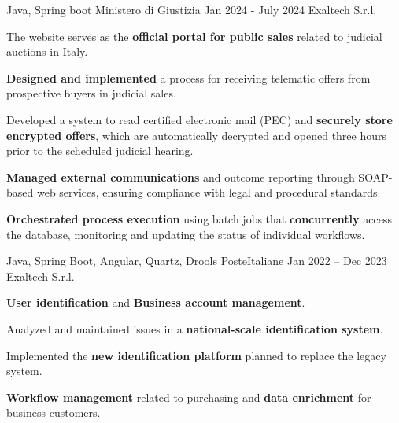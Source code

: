 \begin{cventries}
  \cventry
    {Java, Spring boot} %
    {Ministero di Giustizia} %
    {Jan 2024 - July 2024} %
    {Exaltech S.r.l.} %
    {
      \begin{cvitems} %
        \item {The website serves as the \textbf{official portal for public sales} related to judicial auctions in Italy.}
        \item {\textbf{Designed and implemented} a process for receiving telematic offers from prospective buyers in judicial sales.}
        \item {Developed a system to read certified electronic mail (PEC) and \textbf{securely store encrypted offers}, which are automatically decrypted and opened three hours prior to the scheduled judicial hearing.}  
        \item {\textbf{Managed external communications} and outcome reporting through SOAP-based web services, ensuring compliance with legal and procedural standards.}  
        \item {\textbf{Orchestrated process execution} using batch jobs that \textbf{concurrently} access the database, monitoring and updating the status of individual workflows.}  
      \end{cvitems}
    }

  \cventry
    {Java, Spring Boot, Angular, Quartz, Drools} %
    {PosteItaliane} %
    {Jan 2022 – Dec 2023} %
    {Exaltech S.r.l.} %
    {
      \begin{cvitems} %
        \item {\textbf{User identification} and \textbf{Business account management}.}
        \item {Analyzed and maintained issues in a \textbf{national-scale identification system}.}
        \item {Implemented the \textbf{new identification platform} planned to replace the legacy system.}  
        \item {\textbf{Workflow management} related to purchasing and \textbf{data enrichment} for business customers.}  
      \end{cvitems}
    }

\end{cventries}
